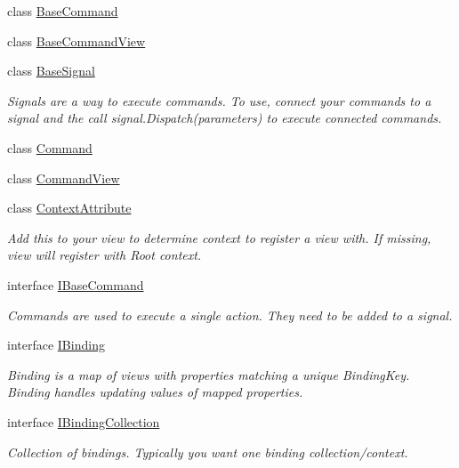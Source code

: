 \begin{DoxyCompactItemize}
\item 
class \mbox{\hyperlink{classcp_games_1_1core_1_1_rapid_m_v_c_1_1_base_command}{Base\+Command}}
\item 
class \mbox{\hyperlink{classcp_games_1_1core_1_1_rapid_m_v_c_1_1_base_command_view}{Base\+Command\+View}}
\item 
class \mbox{\hyperlink{classcp_games_1_1core_1_1_rapid_m_v_c_1_1_base_signal}{Base\+Signal}}
\begin{DoxyCompactList}\small\item\em Signals are a way to execute commands. To use, connect your commands to a signal and the call signal.\+Dispatch(parameters) to execute connected commands. \end{DoxyCompactList}\item 
class \mbox{\hyperlink{classcp_games_1_1core_1_1_rapid_m_v_c_1_1_command}{Command}}
\item 
class \mbox{\hyperlink{classcp_games_1_1core_1_1_rapid_m_v_c_1_1_command_view}{Command\+View}}
\item 
class \mbox{\hyperlink{classcp_games_1_1core_1_1_rapid_m_v_c_1_1_context_attribute}{Context\+Attribute}}
\begin{DoxyCompactList}\small\item\em Add this to your view to determine context to register a view with. If missing, view will register with Root context. \end{DoxyCompactList}\item 
interface \mbox{\hyperlink{interfacecp_games_1_1core_1_1_rapid_m_v_c_1_1_i_base_command}{I\+Base\+Command}}
\begin{DoxyCompactList}\small\item\em Commands are used to execute a single action. They need to be added to a signal. \end{DoxyCompactList}\item 
interface \mbox{\hyperlink{interfacecp_games_1_1core_1_1_rapid_m_v_c_1_1_i_binding}{I\+Binding}}
\begin{DoxyCompactList}\small\item\em Binding is a map of views with properties matching a unique Binding\+Key. Binding handles updating values of mapped properties. \end{DoxyCompactList}\item 
interface \mbox{\hyperlink{interfacecp_games_1_1core_1_1_rapid_m_v_c_1_1_i_binding_collection}{I\+Binding\+Collection}}
\begin{DoxyCompactList}\small\item\em Collection of bindings. Typically you want one binding collection/context. \end{DoxyCompactList}\item 

\end{DoxyCompactItemize}
